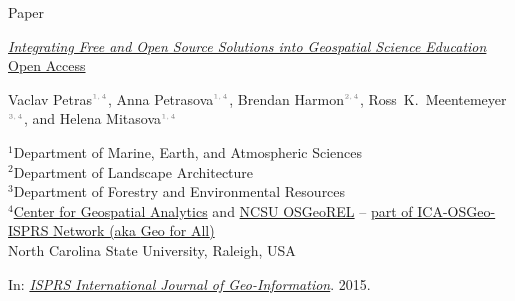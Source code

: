 \documentclass[xcolor={dvipsnames,usenames},beamer,aspectratio=169]{beamer}
\newcommand{\n}[1]{$^{\textcolor{gray}{\mbox{\tiny{#1}}}}$}
\begin{document}
\begin{frame}{Paper}

\href{http://www.mdpi.com/2220-9964/4/2/942}%
  {\emph{Integrating Free and Open Source Solutions into Geospatial Science Education}
  \hfill \footnotesize \color{gray} Open Access}

Vaclav Petras\n{1,\,4},
Anna Petrasova\n{1,\,4},
Brendan Harmon\n{2,\,4},
\mbox{Ross K. Meentemeyer}\n{3,\,4},
and Helena Mitasova\n{1,\,4}

\medskip

{\tiny
$^1$Department of Marine, Earth, and Atmospheric Sciences\\
$^2$Department of Landscape Architecture\\
$^3$Department of Forestry and Environmental Resources\\
$^4$\href{http://cnr.ncsu.edu/geospatial/}{Center for Geospatial Analytics}
and \href{http://geospatial.ncsu.edu/osgeorel/}{NCSU OSGeoREL}
  -- \href{www.geoforall.org}{part of ICA-OSGeo-ISPRS Network (aka \alert{Geo for All})}\\
}{\scriptsize
North Carolina State University, Raleigh, USA\\
}

\medskip

In: \href{http://www.mdpi.com/journal/ijgi/special_issues/science-applications}%
{\emph{ISPRS International Journal of Geo-Information}}. 2015.

\bigskip


\end{frame}
\end{document}
